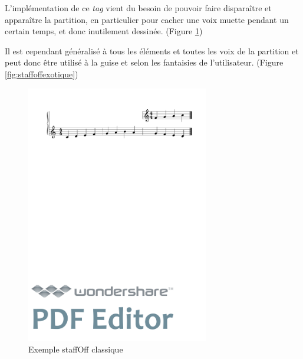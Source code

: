 \documentclass{article}
\begin{document}

L'implémentation de ce \emph{tag} vient du besoin de pouvoir faire disparaître et apparaître la partition, en particulier pour cacher une voix muette pendant un certain temps, et donc inutilement dessinée. (Figure \ref{fig:staffoffsimple}) 

Il est cependant généralisé à tous les éléments et toutes les voix de la partition et peut donc être utilisé à la guise et selon les fantaisies de l'utilisateur. (Figure \ref{fig:staffoffexotique})

\begin{figure}[h]
\centering
\includegraphics[width=8cm]{img/staffoff.pdf}
\caption{ Exemple staffOff classique}
\label{fig:staffoffsimple}
\end{figure}

\end{document}
